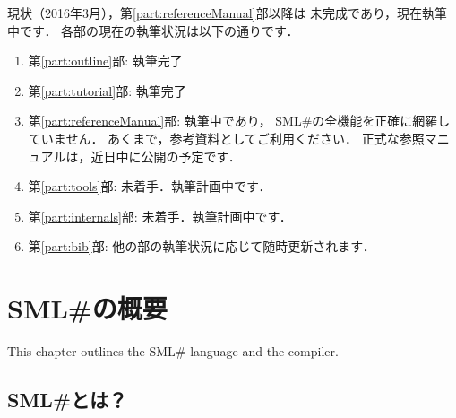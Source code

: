 \documentclass{jbook}
\newif\ifjp
\newcommand{\txt}[2]{#1}
\newcommand{\smlsharp}{SML\#}
\newcommand{\version}{3.0.0}
\begin{document}
	現状（2016年3月），第\ref{part:referenceManual}部以降は
未完成であり，現在執筆中です．
	各部の現在の執筆状況は以下の通りです．
\begin{enumerate}
\item
	第\ref{part:outline}部: 執筆完了
\item
	第\ref{part:tutorial}部: 執筆完了
\item
	第\ref{part:referenceManual}部: 執筆中であり，
\smlsharp{}の全機能を正確に網羅していません．
	あくまで，参考資料としてご利用ください．
	正式な参照マニュアルは，近日中に公開の予定です．
\item
	第\ref{part:tools}部: 未着手．執筆計画中です．
\item
	第\ref{part:internals}部: 未着手．執筆計画中です．
\item
	第\ref{part:bib}部: 他の部の執筆状況に応じて随時更新されます．
\end{enumerate}

%
%
%
%

\chapter{\txt{\smlsharp{}の概要}{Overview of \smlsharp{}}}
\label{chap:intro}

\ifjp%
本章では\smlsharp{}言語の概要を説明します．
\else%
This chapter outlines the \smlsharp{} language and the compiler.
\fi%

\section{\txt{\smlsharp{}とは？}{What is \smlsharp{}？}}
\label{sec:whatIsSmlsharp}
\ifjp%
\end{document}
